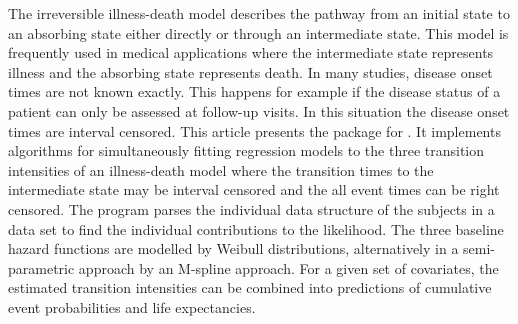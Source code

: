 The irreversible illness-death model describes the pathway from an
initial state to an absorbing state either directly or through an
intermediate state. This model is frequently used in medical
applications where the intermediate state represents illness and the
absorbing state represents death. In many studies, disease onset times
are not known exactly. This happens for example if the disease status
of a patient can only be assessed at follow-up visits. In this situation
the disease onset times are interval censored. This article presents
the  package for . It implements
algorithms for simultaneously fitting regression models to the three
transition intensities of an illness-death model where the transition
times to the intermediate state may be interval censored and the all
event times can be right censored. The program parses the individual
data structure of the subjects in a data set to find the individual
contributions to the likelihood. The three baseline hazard functions
are modelled by Weibull distributions, alternatively in a
semi-parametric approach by an M-spline approach. For a given set of
covariates, the estimated transition intensities can be combined into
predictions of cumulative event probabilities and life expectancies.
